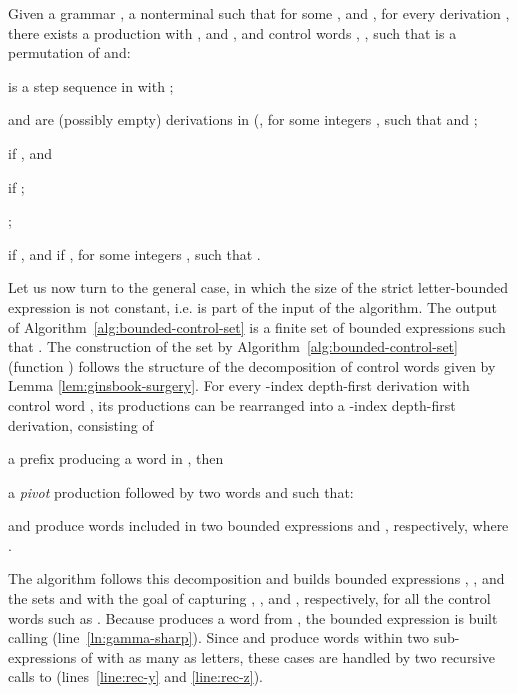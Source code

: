 \documentclass[final]{llncs}
\begin{document}
\begin{lemma}\label{lem:ginsbook-surgery}
  Given a grammar , a nonterminal
   such that  for
  some , and , for every derivation
  , there exists a production  with
  ,  and
  , and
  control words ,
  , such
  that  is a
  permutation of 
  and: \begin{compactenum} 
  
  \item\label{item1:ginsbook-surgery}  is a step sequence in 
  with ;

  \item\label{item2:ginsbook-surgery}  and  are (possibly empty) derivations 
                in  (, for some integers , 
                such that  and ;

  \item\label{item3:ginsbook-surgery} 
  
	if , and
    
		if ;        

  \item\label{item4:ginsbook-surgery} ;
  \item\label{item5:ginsbook-surgery}  if , and  if , for some integers
    , such that .
  \end{compactenum}
\end{lemma}



Let us now turn to the general case, in which the size of the strict
letter-bounded expression  is not constant,
i.e.  is part of the input of the algorithm. The output of
Algorithm~\ref{alg:bounded-control-set} is a finite set of bounded
expressions  such that
. 
The construction of the set  by
Algorithm~\ref{alg:bounded-control-set} (function
) follows the structure 
of the decomposition of control words given by
Lemma \ref{lem:ginsbook-surgery}. For every -index depth-first derivation with 
control word , its productions can be rearranged into a -index 
depth-first derivation, consisting of
\begin{inparaenum}
\item a prefix  producing a word in , then
\item a \emph{pivot} production  followed by two words  and  such that:
\item  and  produce words included in two
bounded expressions  and , respectively, where .
\end{inparaenum}
The algorithm follows this decomposition and builds bounded
expressions , , and the sets
 and  with the goal of capturing
, ,  and , respectively,
for all the control words such as .
Because  produces a word from ,
the bounded expression  is built calling
 (line~\ref{ln:gamma-sharp}). Since
 and  produce words within two sub-expressions of  with as many as  letters, these cases are handled by
two recursive calls to 
(lines~\ref{line:rec-y} and \ref{line:rec-z}).
\end{document}
